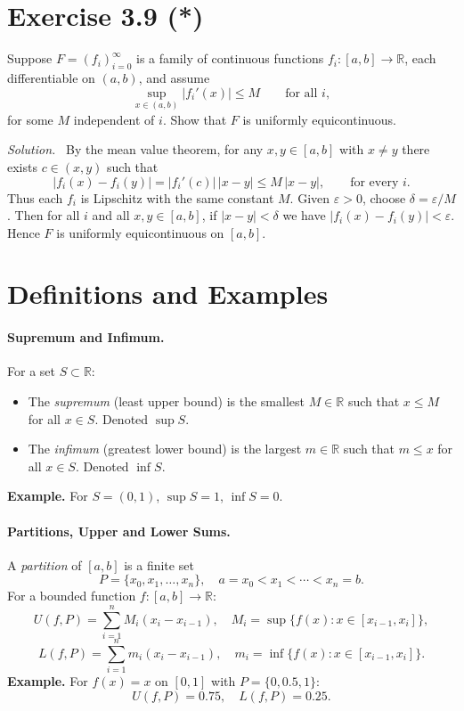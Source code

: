 \documentclass[11pt,a4paper]{article}
\newenvironment{solution}{\par\noindent\textit{Solution.}\ }{\par\vspace{0.5em}}
\begin{document}
\section*{Exercise 3.9 (*)}
Suppose $F=(f_i)_{i=0}^\infty$ is a family of continuous functions $f_i:[a,b]\to\mathbb{R}$,
each differentiable on $(a,b)$, and assume
\[
\sup_{x\in(a,b)}|f_i'(x)|\le M\qquad\text{for all }i,
\]
for some $M$ independent of $i$. Show that $F$ is uniformly equicontinuous.

\begin{solution}
	By the mean value theorem, for any $x,y\in[a,b]$ with $x\ne y$ there exists $c\in(x,y)$ such that
	\[
	|f_i(x)-f_i(y)|=|f_i'(c)|\,|x-y|\le M\,|x-y|,\qquad\text{for every }i.
	\]
	Thus each $f_i$ is Lipschitz with the same constant $M$. Given $\varepsilon>0$, choose $\delta=\varepsilon/M$.
	Then for all $i$ and all $x,y\in[a,b]$, if $|x-y|<\delta$ we have $|f_i(x)-f_i(y)|<\varepsilon$.
	Hence $F$ is uniformly equicontinuous on $[a,b]$.
\end{solution}

\section*{Definitions and Examples}

\paragraph{Supremum and Infimum.}
For a set $S \subset \mathbb{R}$:
\begin{itemize}
	\item The \emph{supremum} (least upper bound) is the smallest $M \in \mathbb{R}$ such that $x \leq M$ for all $x \in S$. Denoted $\sup S$.
	\item The \emph{infimum} (greatest lower bound) is the largest $m \in \mathbb{R}$ such that $m \leq x$ for all $x \in S$. Denoted $\inf S$.
\end{itemize}
\textbf{Example.} For $S=(0,1)$, $\sup S = 1$, $\inf S = 0$.

\paragraph{Partitions, Upper and Lower Sums.}
A \emph{partition} of $[a,b]$ is a finite set
\[
P = \{x_0, x_1, \dots, x_n\}, \quad a = x_0 < x_1 < \cdots < x_n = b.
\]
For a bounded function $f:[a,b]\to\mathbb{R}$:
\[
U(f,P) = \sum_{i=1}^n M_i (x_i - x_{i-1}), \quad M_i = \sup\{ f(x) : x \in [x_{i-1}, x_i]\},
\]
\[
L(f,P) = \sum_{i=1}^n m_i (x_i - x_{i-1}), \quad m_i = \inf\{ f(x) : x \in [x_{i-1}, x_i]\}.
\]
\textbf{Example.} For $f(x) = x$ on $[0,1]$ with $P=\{0,0.5,1\}$:
\[
U(f,P) = 0.75, \quad L(f,P) = 0.25.
\]
\end{document}
